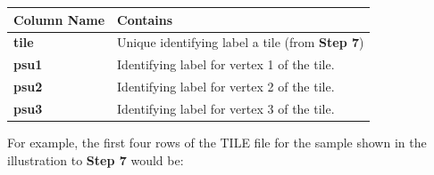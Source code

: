 \documentclass[12pt,a4paper]{book}
\theoremstyle{definition}
\theoremstyle{definition}
\theoremstyle{definition}
\theoremstyle{remark}
\begin{document}
\begin{longtable}[]{@{}ll@{}}
\toprule
\begin{minipage}[b]{0.25\columnwidth}\raggedright
\textbf{Column Name}\strut
\end{minipage} & \begin{minipage}[b]{0.69\columnwidth}\raggedright
\textbf{Contains}\strut
\end{minipage}\tabularnewline
\midrule
\endhead
\begin{minipage}[t]{0.25\columnwidth}\raggedright
\textbf{tile}\strut
\end{minipage} & \begin{minipage}[t]{0.69\columnwidth}\raggedright
Unique identifying label a tile (from \textbf{Step 7})\strut
\end{minipage}\tabularnewline
\begin{minipage}[t]{0.25\columnwidth}\raggedright
\textbf{psu1}\strut
\end{minipage} & \begin{minipage}[t]{0.69\columnwidth}\raggedright
Identifying label for vertex 1 of the tile.\strut
\end{minipage}\tabularnewline
\begin{minipage}[t]{0.25\columnwidth}\raggedright
\textbf{psu2}\strut
\end{minipage} & \begin{minipage}[t]{0.69\columnwidth}\raggedright
Identifying label for vertex 2 of the tile.\strut
\end{minipage}\tabularnewline
\begin{minipage}[t]{0.25\columnwidth}\raggedright
\textbf{psu3}\strut
\end{minipage} & \begin{minipage}[t]{0.69\columnwidth}\raggedright
Identifying label for vertex 3 of the tile.\strut
\end{minipage}\tabularnewline
\bottomrule
\end{longtable}

For example, the first four rows of the TILE file for the sample shown
in the illustration to \textbf{Step 7} would be:
\end{document}
